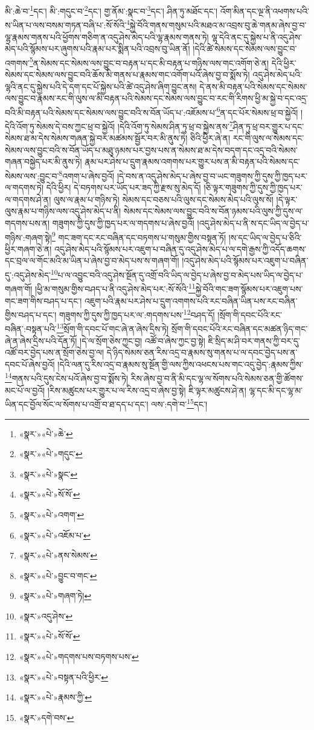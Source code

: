 མི་:ཆེ་བ་\footnote{«སྣར་»«པེ་»ཆེ་}དང་། མི་:གདུང་བ་\footnote{«སྣར་»«པེ་»གདུང་}དང་། གྱ་ནོམ་:སྣང་བ་\footnote{«སྣར་»«པེ་»སྣང་}དང་། ཤིན་ཏུ་མཐོང་དང་། འོག་མིན་དང་ལྔ་ནི་འཕགས་པའི་ས་ཡིན་པ་ལས་བསམ་གཏན་བཞི་པ་:སོ་སོའི་\footnote{«སྣར་»«པེ་»སོ་སོ་}སྐྱེ་བོའི་གནས་གསུམ་པའི་མཐའ་མ་འབྲས་བུ་ཆེ་གནམ་ཞེས་བྱ་བ་ལྷ་རྣམས་གནས་པའི་ཕྱོགས་གཅིག་ན་འདུ་ཤེས་མེད་པའི་ལྷ་རྣམས་གནས་ཏེ། ལྷ་དེའི་ནང་དུ་སྐྱེས་པ་ནི་འདུ་ཤེས་མེད་པའི་སྙོམས་པར་ཞུགས་པའི་རྣམ་པར་སྨིན་པའི་འབྲས་བུ་ཡིན་ནོ། །དེའི་ཚེ་སེམས་དང་སེམས་ལས་བྱུང་བ་འགགས་\footnote{«སྣར་»«པེ་»འགག་}ན་སེམས་དང་སེམས་ལས་བྱུང་བ་བརྟན་པ་དང་མི་བརྟན་པ་གཉིས་ལས་གང་འགོག་ཅེ་ན། དེའི་ཕྱིར་སེམས་དང་སེམས་ལས་བྱུང་བའི་ཆོས་མི་གནས་པ་རྣམས་གང་འགོག་པའོ་ཞེས་བྱ་བ་སྨོས་ཏེ། འདུ་ཤེས་མེད་པའི་ལྷའི་ནང་དུ་སྐྱེས་པའི་དེ་དག་དང་པོ་སྐྱེས་པའི་ཚེ་འདུ་ཤེས་ཞིག་བྱུང་ནས། དེ་ནས་མི་བརྟན་པའི་སེམས་དང་སེམས་ལས་བྱུང་བ་རྣམས་རང་གི་ལུས་ལ་མི་བརྟན་པའི་སེམས་དང་སེམས་ལས་བྱུང་བ་རང་གི་རིགས་ཕྱི་མ་སྐྱེ་བ་དང་འདྲ་བའི་མི་བརྟན་པའི་སེམས་དང་སེམས་ལས་བྱུང་བའི་ས་བོན་ཡོད་པ་:འཇོམས་པ་\footnote{«སྣར་»«པེ་»འཇོམ་པ་}ན་དང་པོར་སེམས་ཕྲ་བ་སྐྱེའོ། །དེའི་འོག་ཏུ་སེམས་དེ་བས་ཀྱང་ཕྲ་བ་སྐྱེའོ། །དེའི་འོག་ཏུ་སེམས་ཤིན་ཏུ་ཕྲ་བ་སྐྱེས་ནས་\footnote{«སྣར་»«པེ་»ནས་སེམས་}ཤིན་ཏུ་ཕྲ་བར་གྱུར་པ་དང་སེམས་ཐ་མ་དེས་སེམས་གཞན་སྐྱེ་བར་མཚམས་སྦྱོར་བར་མི་ནུས་ཏེ། ཅིའི་ཕྱིར་ཞེ་ན། རང་གི་ལུས་ལ་སེམས་དང་སེམས་ལས་བྱུང་བའི་ས་བོན་ཡོད་པ་མཐུ་ཉམས་པར་བྱས་པས་ན་སེམས་ཐ་མ་དེས་བདག་དང་འདྲ་བའི་སེམས་གཞན་བསྐྱེད་པར་མི་ནུས་ཏེ། རྣམ་པར་ཤེས་པ་དྲུག་རྣམས་འགགས་པར་གྱུར་པས་ན་མི་བརྟན་པའི་སེམས་དང་སེམས་ལས་:བྱུང་བ་\footnote{«སྣར་»«པེ་»བྱུང་བ་གང་}འགག་པ་ཞེས་བྱའོ། །དེ་བས་ན་འདུ་ཤེས་མེད་པ་ཞེས་བྱ་བ་ཡང་གཟུགས་ཀྱི་དུས་ཀྱི་ཁྱད་པར་ལ་གདགས་ཏེ། དེའི་ཕྱིར། དེ་བཏགས་པར་ཡོད་པར་ཟད་ཀྱི་རྫས་སུ་མེད་དོ། །ཅི་ལྟར་གཟུགས་ཀྱི་དུས་ཀྱི་ཁྱད་པར་ལ་གདགས་ཤེ་ན། ལུས་ལ་རྣམ་པ་གཉིས་ཏེ། སེམས་དང་བཅས་པའི་ལུས་དང་སེམས་མེད་པའི་ལུས་སོ། །དེ་ལྟར་ལུས་རྣམ་པ་གཉིས་ལས་འདུ་ཤེས་མེད་པ་ནི། སེམས་དང་སེམས་ལས་བྱུང་བའི་ས་བོན་ཉམས་པའི་ལུས་ཀྱི་དུས་ལ་གདགས་པས་ན། གཟུགས་ཀྱི་དུས་ཀྱི་ཁྱད་པར་ལ་གདགས་པ་ཞེས་བྱའོ། །འདུ་ཤེས་མེད་པ་ནི་ས་དང་ཡིད་ལ་བྱེད་པ་གཉིས་:གཞག་སྟེ།\footnote{«སྣར་»«པེ་»གཞག་ཏེ།} གང་ཟག་དང་རང་བཞིན་དང་བཏགས་པ་གསུམ་གྱིས་བསྟན་ཏོ། །ས་དང་ཡིད་ལ་བྱེད་པ་ཅིའི་ཕྱིར་གཞག་ཅེ་ན། འདུ་ཤེས་མེད་པའི་སྙོམས་པར་འཇུག་པ་བཞིན་དུ་འདུ་ཤེས་མེད་པ་ལ་དགེ་རྒྱས་ཀྱི་འདོད་ཆགས་དང་བྲལ་ལ་གོང་མའི་མ་ཡིན་པ་ཞེས་བྱ་བ་མེད་པས་ས་གཞག་གོ། །འདུ་ཤེས་མེད་པའི་སྙོམས་པར་འཇུག་པ་བཞིན་དུ་:འདུ་ཤེས་མེད་\footnote{«སྣར་»འདུ་ཤེས་}པ་ལ་འབྱུང་བའི་འདུ་ཤེས་སྔོན་དུ་འགྲོ་བའི་ཡིད་ལ་བྱེད་པ་ཞེས་བྱ་བ་མེད་པས་ཡིད་ལ་བྱེད་པ་གཞག་གོ། །ཕྱི་མ་གསུམ་གྱིས་བཤད་པ་ནི་འདུ་ཤེས་མེད་པར་:སོ་སོའི་\footnote{«སྣར་»«པེ་»སོ་སོ་}སྐྱེ་བོའི་གང་ཟག་སྙོམས་པར་འཇུག་པས་གང་ཟག་གིས་བཤད་པ་དང་། འཇུག་པའི་རྣམ་པར་ཤེས་པ་དྲུག་འགགས་པའི་རང་བཞིན་ཡིན་པས་རང་བཞིན་གྱིས་བཤད་པ་དང་། གཟུགས་ཀྱི་དུས་ཀྱི་ཁྱད་པར་ལ་:གདགས་པས་\footnote{«སྣར་»«པེ་»གདགས་པས་བཏགས་པས་}བཤད་དོ། །སྲོག་གི་དབང་པོའི་རང་བཞིན་:བསྟན་པའི་\footnote{«སྣར་»«པེ་»བསྟན་པའི་ཕྱིར་}སྲོག་གི་དབང་པོ་གང་ཞེ་ན་ཞེས་དྲིས་ཏེ། སྲོག་གི་དབང་པོའི་རང་བཞིན་དང་མཚན་ཉིད་གང་ཞེ་ན་ཞེས་དྲིས་པའི་དོན་ཏོ། །དེ་ལ་སྲོག་ཅེས་ཀྱང་བྱ། འཚོ་བ་ཞེས་ཀྱང་བྱ་སྟེ། ཇི་སྲིད་མ་ཤི་བར་གནས་ཀྱི་བར་དུ་འཚོ་བར་བྱེད་པས་ན་སྲོག་ཅེས་བྱ་ལ། དེ་ཉིད་སེམས་ཅན་རིས་འདྲ་བ་རྣམས་སུ་གནས་པ་ལ་དབང་བྱེད་པས་ན་དབང་པོ་ཞེས་བྱའོ། །དེའི་ལན་དུ་རིས་འདྲ་བ་རྣམས་སུ་སྔོན་གྱི་ལས་ཀྱིས་འཕངས་པས་གང་འདུ་བྱེད་:རྣམས་ཀྱིས་\footnote{«སྣར་»«པེ་»རྣམས་ཀྱི་}གནས་པའི་དུས་ངེས་པའོ་ཞེས་བྱ་བ་སྨོས་ཏེ། རིས་ཞེས་བྱ་བ་ནི་མི་དང་ལྷ་ལ་སོགས་པའི་སེམས་ཅན་གྱི་ཚོགས་མང་པོ་ལ་བྱའོ། །རིས་མཚུངས་པར་གྱུར་པ་ལ་རིས་འདྲ་བ་ཞེས་བྱ་སྟེ། ཇི་ལྟར་མཚུངས་ཤེ་ན། ལྷ་དང་མི་དང་ལྷ་མ་ཡིན་དང་བྱོལ་སོང་ལ་སོགས་པ་འགྲོ་བ་ཐ་དད་པ་དང་། ལས་:དགེ་བ་\footnote{«སྣར་»དགེ་བས་}དང་། 